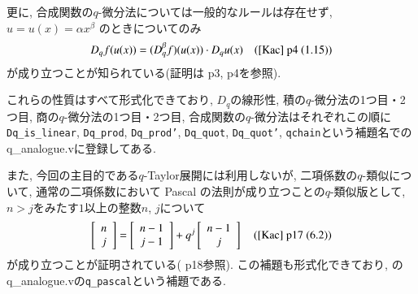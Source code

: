 \documentclass[11pt]{jsreport}
\theoremstyle{mystyle}
\newcommand{\qcoe}[2]{\left[\begin{array}{ccc}#1\\#2\end{array}\right]}
\newcommand{\0}{\textbf{0}}
\newcommand{\1}{\textbf{1}}
\newcommand{\2}{\textbf{2}}
\begin{document}
更に, 合成関数の$q$-微分法については一般的なルールは存在せず, $u = u(x) = \alpha x^{\beta}$
のときについてのみ
\[
  D_q f (u (x)) = (D_q^{\beta} f)(u(x)) \cdot D_q u(x) \quad \text{(\cite{Kac} p4 (1.15))}
\]
が成り立つことが知られている(証明は\cite{Kac} p3, p4を参照). 

これらの性質はすべて形式化できており, $D_q$の線形性, 積の$q$-微分法の1つ目・2つ目, 商の$q$-微分法の1つ目・2つ目, 合成関数の$q$-微分法はそれぞれこの順に{\tt Dq\_is\_linear}, {\tt Dq\_prod}, {\tt Dq\_prod'}, {\tt Dq\_quot}, {\tt Dq\_quot'}, {\tt qchain}という補題名で\cite{coq ana}のq\_analogue.vに登録してある. 

また, 今回の主目的である$q$-Taylor展開には利用しないが, 二項係数の$q$-類似について, 通常の二項係数において Pascal の法則が成り立つことの$q$-類似版として, $n > j$をみたす$1$以上の整数$n$, $j$について
\[
  \qcoe{n}{j} = \qcoe{n - 1}{j - 1} + q^j \qcoe{n - 1}{j} \quad \text{(\cite{Kac} p17 (6.2))}
\]
が成り立つことが証明されている(\cite{Kac} p18参照). この補題も形式化できており, \cite{coq qana}のq\_analogue.vの{\tt q\_pascal}という補題である.
\end{document}

